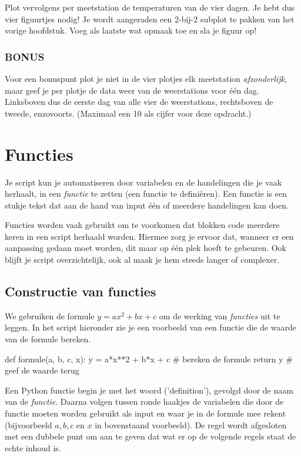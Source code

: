 \documentclass[a4paper,11pt, fleqn]{article}
\newcommand{\ditwc}{Naam van het huidige werkcollege}
\begin{document}
Plot vervolgens per meetstation de temperaturen van de vier dagen. Je hebt dus vier figuurtjes nodig! Je wordt aangeraden een 2-bij-2 subplot te pakken van het vorige hoofdstuk. Voeg als laatste wat opmaak toe en sla je figuur op!

\subsubsection*{BONUS}
Voor een bonuspunt plot je niet in de vier plotjes elk meetstation {\it afzonderlijk}, maar geef je per plotje de data weer van de weerstations voor \'e\'en dag. Linksboven dus de eerste dag van alle vier de weerstations, rechtsboven de tweede, enzovoorts. (Maximaal een 10 als cijfer voor deze opdracht.)

\clearpage
\renewcommand{\ditwc}{Functies}
\section[Functies]{\ditwc}
Je script kun je automatiseren door variabelen en de handelingen die je vaak herhaalt, in een \textit{functie} te zetten (een functie te defini\"eren). Een functie is een stukje tekst dat aan de hand van input \'e\'en of meerdere handelingen kan doen.

Functies worden vaak gebruikt om te voorkomen dat blokken code meerdere keren in een script herhaald worden. 
Hiermee zorg je ervoor dat, wanneer er een aanpassing gedaan moet worden, dit maar op \'e\'en plek hoeft te gebeuren. 
Ook blijft je script overzichtelijk, ook al maak je hem steeds langer of complexer. 

\subsection{Constructie van functies}
We gebruiken de formule $y = a x^2+b x + c$ om de werking van \textit{functies} uit te leggen. In het script hieronder zie je een voorbeeld van een functie die de waarde van de formule bereken.

\begin{python}
def formule(a, b, c, x):
	y = a*x**2 + b*x + c   # bereken de formule
	return y               # geef de waarde terug
\end{python} 

Een Python functie begin je met het woord  ('definition'), gevolgd door de naam van de \textit{functie}. Daarna volgen tussen ronde haakjes de variabelen die door de functie moeten worden gebruikt als input en waar je in de formule mee rekent (bijvoorbeeld $a, b, c$ en $x$ in bovenstaand voorbeeld). De regel wordt afgesloten met een dubbele punt om aan te geven dat wat er op de volgende regels staat de echte inhoud is. 
\end{document}
